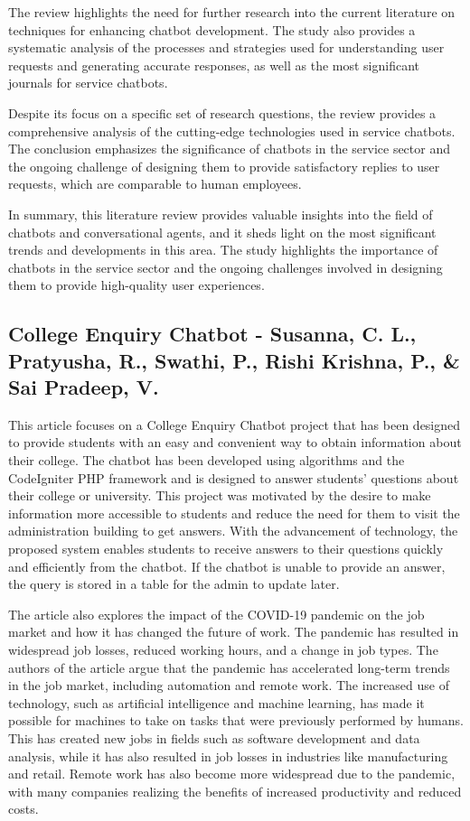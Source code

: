\documentclass[12pt, twoside]{article}
\begin{document}
The review highlights the need for further research into the current literature on techniques for enhancing chatbot development. The study also provides a systematic analysis of the processes and strategies used for understanding user requests and generating accurate responses, as well as the most significant journals for service chatbots.

Despite its focus on a specific set of research questions, the review provides a comprehensive analysis of the cutting-edge technologies used in service chatbots. The conclusion emphasizes the significance of chatbots in the service sector and the ongoing challenge of designing them to provide satisfactory replies to user requests, which are comparable to human employees.

In summary, this literature review provides valuable insights into the field of chatbots and conversational agents, and it sheds light on the most significant trends and developments in this area. The study highlights the importance of chatbots in the service sector and the ongoing challenges involved in designing them to provide high-quality user experiences.

\subsection{College Enquiry Chatbot - Susanna, C. L., Pratyusha, R., Swathi, P., Rishi Krishna, P., \& Sai Pradeep, V.\cite{4}}
This article focuses on a College Enquiry Chatbot project that has been designed to provide students with an easy and convenient way to obtain information about their college. The chatbot has been developed using algorithms and the CodeIgniter PHP framework and is designed to answer students' questions about their college or university. This project was motivated by the desire to make information more accessible to students and reduce the need for them to visit the administration building to get answers. With the advancement of technology, the proposed system enables students to receive answers to their questions quickly and efficiently from the chatbot. If the chatbot is unable to provide an answer, the query is stored in a table for the admin to update later.

The article also explores the impact of the COVID-19 pandemic on the job market and how it has changed the future of work. The pandemic has resulted in widespread job losses, reduced working hours, and a change in job types. The authors of the article argue that the pandemic has accelerated long-term trends in the job market, including automation and remote work. The increased use of technology, such as artificial intelligence and machine learning, has made it possible for machines to take on tasks that were previously performed by humans. This has created new jobs in fields such as software development and data analysis, while it has also resulted in job losses in industries like manufacturing and retail. Remote work has also become more widespread due to the pandemic, with many companies realizing the benefits of increased productivity and reduced costs.
\end{document}
